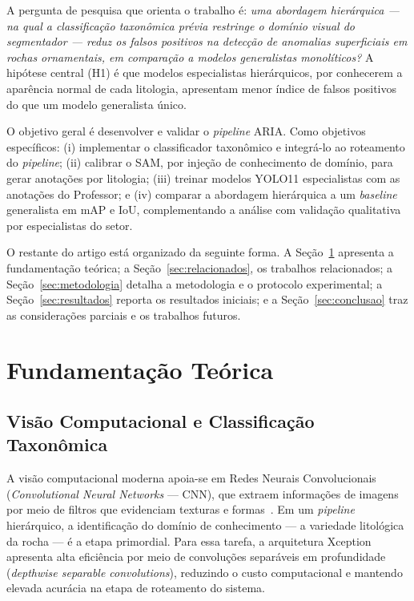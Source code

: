 \documentclass[12pt]{article}
\begin{document}
A pergunta de pesquisa que orienta o trabalho é: \textit{uma abordagem hierárquica --- na qual a classificação taxonômica prévia restringe o domínio visual do segmentador --- reduz os falsos positivos na detecção de anomalias superficiais em rochas ornamentais, em comparação a modelos generalistas monolíticos?} A hipótese central (H1) é que modelos especialistas hierárquicos, por conhecerem a aparência normal de cada litologia, apresentam menor índice de falsos positivos do que um modelo generalista único.

O objetivo geral é desenvolver e validar o \textit{pipeline} ARIA. Como objetivos específicos: (i) implementar o classificador taxonômico e integrá-lo ao roteamento do \textit{pipeline}; (ii) calibrar o SAM, por injeção de conhecimento de domínio, para gerar anotações por litologia; (iii) treinar modelos YOLO11 especialistas com as anotações do Professor; e (iv) comparar a abordagem hierárquica a um \textit{baseline} generalista em mAP e IoU, complementando a análise com validação qualitativa por especialistas do setor.

O restante do artigo está organizado da seguinte forma. A Seção~\ref{sec:fundamentacao} apresenta a fundamentação teórica; a Seção~\ref{sec:relacionados}, os trabalhos relacionados; a Seção~\ref{sec:metodologia} detalha a metodologia e o protocolo experimental; a Seção~\ref{sec:resultados} reporta os resultados iniciais; e a Seção~\ref{sec:conclusao} traz as considerações parciais e os trabalhos futuros.

\section{Fundamentação Teórica}
\label{sec:fundamentacao}

\subsection{Visão Computacional e Classificação Taxonômica}

A visão computacional moderna apoia-se em Redes Neurais Convolucionais (\textit{Convolutional Neural Networks} --- CNN), que extraem informações de imagens por meio de filtros que evidenciam texturas e formas~\cite{deeplearning_lecun2015}. Em um \textit{pipeline} hierárquico, a identificação do domínio de conhecimento --- a variedade litológica da rocha --- é a etapa primordial. Para essa tarefa, a arquitetura Xception~\cite{xception_chollet2017} apresenta alta eficiência por meio de convoluções separáveis em profundidade (\textit{depthwise separable convolutions}), reduzindo o custo computacional e mantendo elevada acurácia na etapa de roteamento do sistema.
\end{document}
